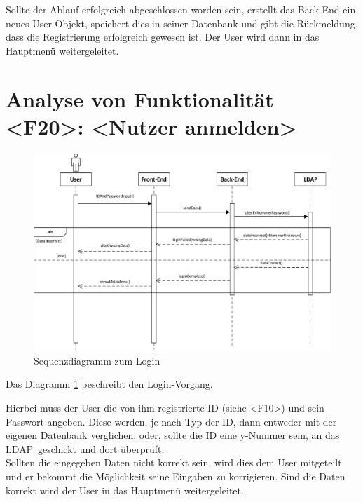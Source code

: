 Sollte der Ablauf erfolgreich abgeschlossen worden sein, erstellt das Back-End ein neues User-Objekt, speichert dies in seiner Datenbank und gibt die Rückmeldung, dass die Registrierung erfolgreich gewesen ist. Der User wird dann in das Hauptmenü weitergeleitet.

\newpage
\section{Analyse von Funktionalität <F20>: <Nutzer anmelden>}
\begin{figure}[h]
\centering
\includegraphics[width=1\textwidth]{figures/sequenz_F20.pdf}
\caption{Sequenzdiagramm zum Login}
\label{sequence_f20}
\end{figure}
Das Diagramm \ref{sequence_f20} beschreibt den Login-Vorgang. 

Hierbei muss der User die von ihm registrierte ID (siehe <F10>) und sein Passwort angeben. Diese werden, je nach Typ der ID, dann entweder mit der eigenen Datenbank verglichen, oder, sollte die ID eine y-Nummer sein, an das \glqq LDAP\grqq ~geschickt und dort überprüft.\\
Sollten die eingegeben Daten nicht korrekt sein, wird dies dem User mitgeteilt und er bekommt die Möglichkeit seine Eingaben zu korrigieren. Sind die Daten korrekt wird der User in das Hauptmenü weitergeleitet.

\newpage
